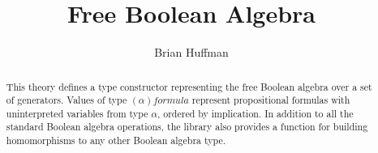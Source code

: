 \documentclass[11pt,a4paper]{article}
\begin{document}
\title{Free Boolean Algebra}
\author{Brian Huffman}
\maketitle

\begin{abstract}
This theory defines a type constructor representing the free Boolean
algebra over a set of generators.  Values of type
$(\alpha)\mathit{formula}$ represent propositional formulas with
uninterpreted variables from type $\alpha$, ordered by implication.
In addition to all the standard Boolean algebra operations, the
library also provides a function for building homomorphisms to any
other Boolean algebra type.
\end{abstract}


\end{document}
